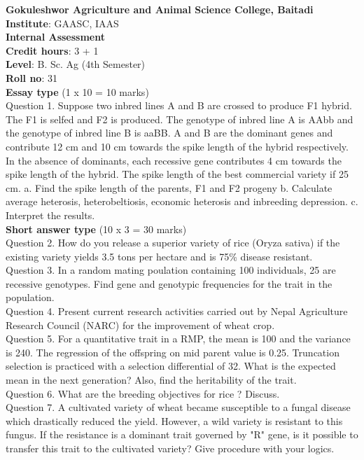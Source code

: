 \documentclass[12pt]{article}\usepackage[]{graphicx}\usepackage[]{color}
\begin{document}
\clearpage 
{\centering \Large{\textbf{Gokuleshwor Agriculture and Animal Science College, Baitadi}} \\[0.25cm]
            \textbf{Institute}: GAASC, IAAS \\[0.2cm]
            \textbf{Internal Assessment} \\[0.2cm]} 
\textbf{Credit hours}: 3 + 1 \\ 
\textbf{Level}: B. Sc. Ag (4th Semester) \\
\textbf{Roll no}: 31 \\[0.5cm] 
\textbf{Essay type} (1 x 10 = 10 marks) \\
Question 1. Suppose two inbred lines A and B are crossed to produce F1 hybrid. The F1 is selfed and F2 is produced. The genotype of inbred line A is AAbb and the genotype of inbred line B is aaBB. A and B are the dominant genes and contribute 12 cm and 10 cm towards the spike length of the hybrid respectively. In the absence of dominants, each recessive gene contributes 4 cm towards the spike length of the hybrid. The spike length of the best commercial variety if 25 cm. a. Find the spike length of the parents, F1 and F2 progeny b. Calculate average heterosis, heterobeltiosis, economic heterosis and inbreeding depression. c. Interpret the results.\\
\textbf{Short answer type} (10 x 3 = 30 marks) \\
Question 2. How do you release a superior variety of rice (Oryza sativa) if the existing variety yields 3.5 tons per hectare and is 75\% disease resistant.\\
Question 3. In a random mating poulation containing 100 individuals, 25 are recessive genotypes. Find gene and genotypic frequencies for the trait in the population.\\
Question 4. Present current research activities carried out by Nepal Agriculture Research Council (NARC) for the improvement of wheat crop.\\
Question 5. For a quantitative trait in a RMP, the mean is 100 and the variance is 240. The regression of the offspring on mid parent value is 0.25. Truncation selection is practiced with a selection differential of 32. What is the expected mean in the next generation? Also, find the heritability of the trait.\\
Question 6. What are the breeding objectives for rice ? Discuss.\\
Question 7. A cultivated variety of wheat became susceptible to a fungal disease which drastically reduced the yield. However, a wild variety is resistant to this fungus. If the resistance is a dominant trait governed by "R" gene, is it possible to transfer this trait to the cultivated variety? Give procedure with your logics.\\
\end{document}
